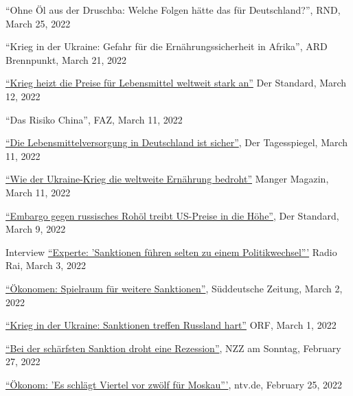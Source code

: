\documentclass{article}
\begin{document}
\begin{minipage}[t]{0.8\textwidth}
    ``Ohne Öl aus der Druschba: Welche Folgen hätte das für Deutschland?'', RND, March 25, 2022 \par
    ``Krieg in der Ukraine: Gefahr für die Ernährungssicherheit in Afrika'', ARD Brennpunkt, March 21, 2022 \par
    \href{https://www.derstandard.de/story/2000134038874/krieg-heizt-die-preise-fuer-lebensmittel-weltweit-stark-an}{``Krieg heizt die Preise für Lebensmittel weltweit stark an''} Der Standard, March 12, 2022 \par
    ``Das Risiko China'', FAZ, March 11, 2022 \par
    \href{https://www.tagesspiegel.de/wirtschaft/agrarminister-cem-oezdemir-zu-den-folgen-des-kriegs-die-lebensmittelversorgung-in-deutschland-ist-sicher/28155160.html}{``Die Lebensmittelversorgung in Deutschland ist sicher''}, Der Tagesspiegel, March 11, 2022 \par
    \href{https://www.manager-magazin.de/politik/wie-es-um-die-ernaehrungssicherheit-steht-ausfall-der-ukraine-als-getreide-exporteur-trifft-afrika-hart-a-fdf304e9-e490-4d78-8cf1-f56464958af1}{``Wie der Ukraine-Krieg die weltweite Ernährung bedroht''} Manger Magazin, March 11, 2022 \par
    \href{https://www.derstandard.at/story/2000133979024/embargo-gegen-russisches-rohoel-treibt-us-preise-in-die-hoehe}{``Embargo gegen russisches Rohöl treibt US-Preise in die Höhe''}, Der Standard, March 9, 2022 \par
    Interview \href{https://www.rainews.it/tgr/tagesschau/audio/2022/03/tag-Hendrik-Mahlkow-Institut-fuer-Weltwirtschaft-Kiel-Sanktionen-Russland-Ukrainekrieg-4be0c70d-61c5-4749-9088-689b3ee625f2.html}{``Experte: 'Sanktionen führen selten zu einem Politikwechsel'''} Radio Rai, March 3, 2022 \par
    \href{https://www.sueddeutsche.de/wirtschaft/strafmassnahmen-oekonomen-spielraum-fuer-weitere-sanktionen-1.5538934}{``Ökonomen: Spielraum für weitere Sanktionen''}, Süddeutsche Zeitung, March 2, 2022 \par
    \href{https://orf.at/stories/3250156/}{``Krieg in der Ukraine: Sanktionen treffen Russland hart''} ORF, March 1, 2022 \par
    \href{https://magazin.nzz.ch/nzz-am-sonntag/international/bei-der-schaerfsten-sanktion-droht-eine-rezession-ld.1671972?reduced=true}{``Bei der schärfsten Sanktion droht eine Rezession''}, NZZ am Sonntag, February 27, 2022 \par
    \href{https://www.n-tv.de/wirtschaft/Okonom-Es-schlaegt-Viertel-vor-zwoelf-fuer-Moskau-article23155253.html}{``Ökonom: 'Es schlägt Viertel vor zwölf für Moskau'''}, ntv.de, February 25, 2022 \par

\end{minipage}
\end{document}
